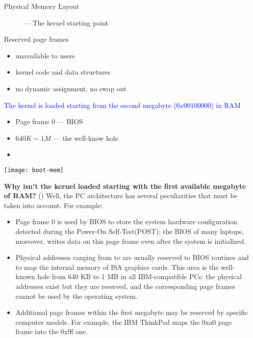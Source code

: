 \begin{frame}{Physical Memory Layout}
  \begin{description}
  \item[]--- The kernel starting point
  \end{description}
  \begin{varwidth}{.49\textwidth}
    \begin{block}{Reserved page frames}
      \begin{itemize}
      \item unavailable to users
      \item kernel code and data structures
      \item no dynamic assignment, no swap out
      \end{itemize}
    \end{block}
    \textcolor{blue}{The kernel is loaded starting from the second megabyte ($0x00100000$)
      in RAM}
    \begin{itemize}
    \item Page frame 0 --- BIOS
    \item $640K\sim{}1M$ --- the well-know hole
    \item {}
    \end{itemize}
  \end{varwidth}\hfill
  \begin{varwidth}{.49\textwidth}
    \texttt{[image: boot-mem]}
  \end{varwidth}
\end{frame}

\textbf{Why isn't the kernel loaded starting with the first available megabyte of RAM?}
(\cite[Sec 2.5.3]{bovet2005understanding}) Well, the PC architecture has several
peculiarities that must be taken into account. For example:

\begin{itemize}
\item Page frame 0 is used by BIOS to store the system hardware configuration detected
  during the Power-On Self-Test(POST); the BIOS of many laptops, moreover, writes data on
  this page frame even after the system is initialized.
\item Physical addresses ranging from  to  are usually
  reserved to BIOS routines and to map the internal memory of ISA graphics cards. This
  area is the well-known hole from 640 KB to 1 MB in all IBM-compatible PCs: the physical
  addresses exist but they are reserved, and the corresponding page frames cannot be used
  by the operating system.
\item Additional page frames within the first megabyte may be reserved by specific computer
  models. For example, the IBM ThinkPad maps the 0xa0 page frame into the 0x9f one.
\end{itemize}

